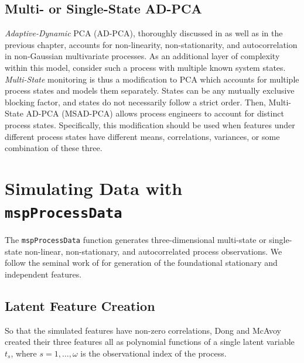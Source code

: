 \documentclass{report}\usepackage[]{graphicx}\usepackage[]{color}
\begin{document}
\subsection{Multi- or Single-State AD-PCA}
\emph{Adaptive-Dynamic} PCA (AD-PCA), thoroughly discussed in \cite{kazor_comparison_2016} as well as in the previous chapter, accounts for non-linearity, non-stationarity, and autocorrelation in non-Gaussian multivariate processes. As an additional layer of complexity within this model, consider such a process with multiple known system states. \emph{Multi-State} monitoring is thus a modification to PCA which accounts for multiple process states and models them separately. States can be any mutually exclusive blocking factor, and states do not necessarily follow a strict order. Then, Multi-State AD-PCA (MSAD-PCA) allows process engineers to account for distinct process states. Specifically, this modification should be used when features under different process states have different means, correlations, variances, or some combination of these three.




\section{Simulating Data with \texttt{mspProcessData}} \label{sec:D_DataGen}
The \texttt{mspProcessData} function generates three-dimensional multi-state or single-state non-linear, non-stationary, and autocorrelated process observations. We follow the seminal work of \cite{dong_batch_1996} for generation of the foundational stationary and independent features.


\subsection{Latent Feature Creation}
So that the simulated features have non-zero correlations, Dong and McAvoy created their three features all as polynomial functions of a single latent variable $t_s$, where $s = 1, \ldots, \omega$ is the observational index of the process.
\end{document}
